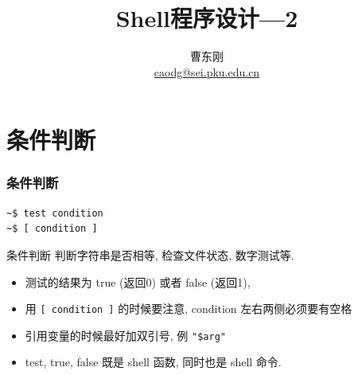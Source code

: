 \documentclass[compress]{beamer}
\begin{document}
					
\title{Shell程序设计---2}

\author[\href{http://c.pku.edu.cn/}{http://c.pku.edu.cn/}]
{曹东刚\\\href{mailto:caodg@sei.pku.edu.cn}{caodg@sei.pku.edu.cn}}


\date{}


\begin{frame}
	\titlepage
\end{frame}

\section{条件判断}

\begin{frame}[fragile]
\frametitle{条件判断}

\begin{Verbatim}
~$ test condition
~$ [ condition ]
\end{Verbatim}

\begin{block}{条件判断} 
判断字符串是否相等, 检查文件状态, 数字测试等.
\begin{itemize}
\item 测试的结果为 true (返回0) 或者 false (返回1),
\item 用 \verb*~[ condition ]~ 的时候要注意, condition 左右两侧必须要有空格
\item 引用变量的时候最好加双引号, 例 \verb~"$arg"~
\item test, true, false 既是 shell 函数, 同时也是 shell 命令.
\end{itemize}
\end{block}
\end{frame}
\end{document}
